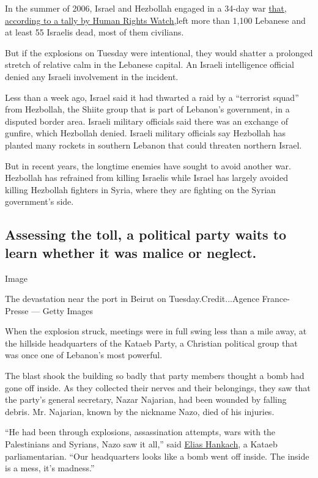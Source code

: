 In the summer of 2006, Israel and Hezbollah engaged in a 34-day war
\href{https://www.hrw.org/report/2007/09/05/why-they-died/civilian-casualties-lebanon-during-2006-war\#}{that,
according to a tally by Human Rights Watch,}left more than 1,100
Lebanese and at least 55 Israelis dead, most of them civilians.

But if the explosions on Tuesday were intentional, they would shatter a
prolonged stretch of relative calm in the Lebanese capital. An Israeli
intelligence official denied any Israeli involvement in the incident.

Less than a week ago, Israel said it had thwarted a raid by a
``terrorist squad'' from Hezbollah, the Shiite group that is part of
Lebanon's government, in a disputed border area. Israeli military
officials said there was an exchange of gunfire, which Hezbollah denied.
Israeli military officials say Hezbollah has planted many rockets in
southern Lebanon that could threaten northern Israel.

But in recent years, the longtime enemies have sought to avoid another
war. Hezbollah has refrained from killing Israelis while Israel has
largely avoided killing Hezbollah fighters in Syria, where they are
fighting on the Syrian government's side.

\hypertarget{assessing-the-toll-a-political-party-waits-to-learn-whether-it-was-malice-or-neglect}{%
\subsection{Assessing the toll, a political party waits to learn whether
it was malice or
neglect.}\label{assessing-the-toll-a-political-party-waits-to-learn-whether-it-was-malice-or-neglect}}

Image

The devastation near the port in Beirut on Tuesday.Credit...Agence
France-Presse --- Getty Images

When the explosion struck, meetings were in full swing less than a mile
away, at the hillside headquarters of the Kataeb Party, a Christian
political group that was once one of Lebanon's most powerful.

The blast shook the building so badly that party members thought a bomb
had gone off inside. As they collected their nerves and their
belongings, they saw that the party's general secretary, Nazar Najarian,
had been wounded by falling debris. Mr. Najarian, known by the nickname
Nazo, died of his injuries.

``He had been through explosions, assassination attempts, wars with the
Palestinians and Syrians, Nazo saw it all,'' said
\href{https://www.facebook.com/EliasHankach2018/}{Elias Hankach}, a
Kataeb parliamentarian. ``Our headquarters looks like a bomb went off
inside. The inside is a mess, it's madness.''

